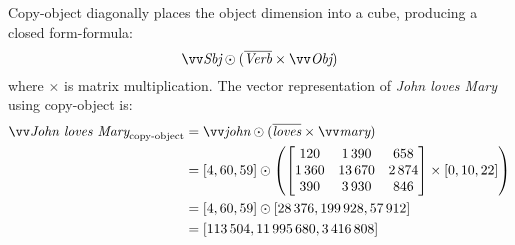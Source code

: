 Copy-object diagonally places the object dimension into a cube, producing a closed form-formula:
%
\begin{equation*}
  \ov{\text{\it Sbj}} \odot (\overline{\text{\it Verb}} \times \ov{\text{\it Obj}})
\end{equation*}
%
where $\times$ is matrix multiplication. The vector representation of \textit{John loves Mary} using copy-object is:
%
\begin{align*}
  \ov{\text{\it John loves Mary}}_{\text{copy-object}} &=\ov{\text{\it john}} \odot (\overline{\text{\it loves}} \times \ov{\text{\it mary}}) \\
                                                       &= [4, 60, 59]%
                                                         \odot \left(%
                                                         \begin{bmatrix}
                                                           120 &  1\,390 &    658 \\
                                                           1\,360 & 13\,670 & 2\,874 \\
                                                           390 &  3\,930 &    846
                                                         \end{bmatrix} %
                                                         \times%
                                                         [0, 10, 22]%
                                                                           \right) \\
                                                       &= [4, 60, 59] \odot [28\,376, 199\,928,  57\,912] \\
                                                       &= [113\,504, 11\,995\,680,  3\,416\,808]
\end{align*}

